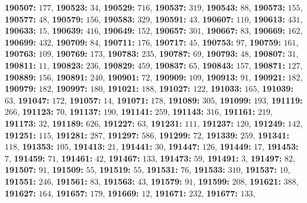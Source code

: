 \textsf{\bfseries 190507:} $177$, \textsf{\bfseries 190523:} $34$, \textsf{\bfseries 190529:} $716$, \textsf{\bfseries 190537:} $319$, \textsf{\bfseries 190543:} $88$, \textsf{\bfseries 190573:} $155$, \textsf{\bfseries 190577:} $48$, \textsf{\bfseries 190579:} $156$, \textsf{\bfseries 190583:} $329$, \textsf{\bfseries 190591:} $43$, \textsf{\bfseries 190607:} $110$, \textsf{\bfseries 190613:} $431$, \textsf{\bfseries 190633:} $15$, \textsf{\bfseries 190639:} $416$, \textsf{\bfseries 190649:} $152$, \textsf{\bfseries 190657:} $301$, \textsf{\bfseries 190667:} $83$, \textsf{\bfseries 190669:} $162$, \textsf{\bfseries 190699:} $432$, \textsf{\bfseries 190709:} $84$, \textsf{\bfseries 190711:} $176$, \textsf{\bfseries 190717:} $45$, \textsf{\bfseries 190753:} $97$, \textsf{\bfseries 190759:} $161$, \textsf{\bfseries 190763:} $109$, \textsf{\bfseries 190769:} $173$, \textsf{\bfseries 190783:} $235$, \textsf{\bfseries 190787:} $69$, \textsf{\bfseries 190793:} $48$, \textsf{\bfseries 190807:} $31$, \textsf{\bfseries 190811:} $11$, \textsf{\bfseries 190823:} $236$, \textsf{\bfseries 190829:} $459$, \textsf{\bfseries 190837:} $65$, \textsf{\bfseries 190843:} $157$, \textsf{\bfseries 190871:} $127$, \textsf{\bfseries 190889:} $156$, \textsf{\bfseries 190891:} $240$, \textsf{\bfseries 190901:} $72$, \textsf{\bfseries 190909:} $109$, \textsf{\bfseries 190913:} $91$, \textsf{\bfseries 190921:} $182$, \textsf{\bfseries 190979:} $182$, \textsf{\bfseries 190997:} $180$, \textsf{\bfseries 191021:} $188$, \textsf{\bfseries 191027:} $122$, \textsf{\bfseries 191033:} $165$, \textsf{\bfseries 191039:} $63$, \textsf{\bfseries 191047:} $172$, \textsf{\bfseries 191057:} $14$, \textsf{\bfseries 191071:} $178$, \textsf{\bfseries 191089:} $305$, \textsf{\bfseries 191099:} $193$, \textsf{\bfseries 191119:} $266$, \textsf{\bfseries 191123:} $70$, \textsf{\bfseries 191137:} $190$, \textsf{\bfseries 191141:} $259$, \textsf{\bfseries 191143:} $316$, \textsf{\bfseries 191161:} $219$, \textsf{\bfseries 191173:} $32$, \textsf{\bfseries 191189:} $626$, \textsf{\bfseries 191227:} $63$, \textsf{\bfseries 191231:} $111$, \textsf{\bfseries 191237:} $120$, \textsf{\bfseries 191249:} $142$, \textsf{\bfseries 191251:} $115$, \textsf{\bfseries 191281:} $287$, \textsf{\bfseries 191297:} $586$, \textsf{\bfseries 191299:} $72$, \textsf{\bfseries 191339:} $259$, \textsf{\bfseries 191341:} $118$, \textsf{\bfseries 191353:} $105$, \textsf{\bfseries 191413:} $21$, \textsf{\bfseries 191441:} $30$, \textsf{\bfseries 191447:} $126$, \textsf{\bfseries 191449:} $17$, \textsf{\bfseries 191453:} $7$, \textsf{\bfseries 191459:} $71$, \textsf{\bfseries 191461:} $42$, \textsf{\bfseries 191467:} $133$, \textsf{\bfseries 191473:} $59$, \textsf{\bfseries 191491:} $3$, \textsf{\bfseries 191497:} $82$, \textsf{\bfseries 191507:} $91$, \textsf{\bfseries 191509:} $55$, \textsf{\bfseries 191519:} $55$, \textsf{\bfseries 191531:} $76$, \textsf{\bfseries 191533:} $310$, \textsf{\bfseries 191537:} $10$, \textsf{\bfseries 191551:} $246$, \textsf{\bfseries 191561:} $83$, \textsf{\bfseries 191563:} $43$, \textsf{\bfseries 191579:} $91$, \textsf{\bfseries 191599:} $208$, \textsf{\bfseries 191621:} $388$, \textsf{\bfseries 191627:} $164$, \textsf{\bfseries 191657:} $179$, \textsf{\bfseries 191669:} $12$, \textsf{\bfseries 191671:} $232$, \textsf{\bfseries 191677:} $133$, 

